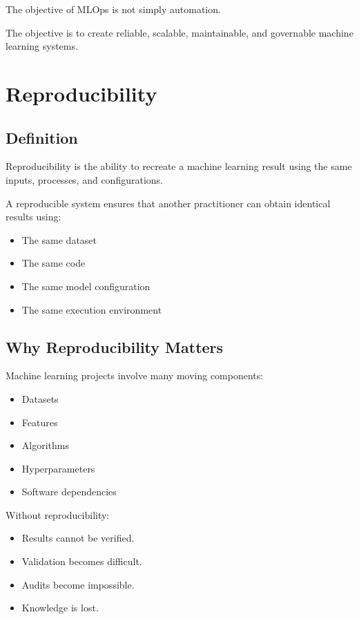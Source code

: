 The objective of MLOps is not simply automation.

The objective is to create reliable, scalable, maintainable, and governable machine learning systems.

\section{Reproducibility}

\subsection{Definition}

Reproducibility is the ability to recreate a machine learning result using the same inputs, processes, and configurations.

A reproducible system ensures that another practitioner can obtain identical results using:

\begin{itemize}
    \item The same dataset
    \item The same code
    \item The same model configuration
    \item The same execution environment
\end{itemize}

\subsection{Why Reproducibility Matters}

Machine learning projects involve many moving components:

\begin{itemize}
    \item Datasets
    \item Features
    \item Algorithms
    \item Hyperparameters
    \item Software dependencies
\end{itemize}

Without reproducibility:

\begin{itemize}
    \item Results cannot be verified.
    \item Validation becomes difficult.
    \item Audits become impossible.
    \item Knowledge is lost.
\end{itemize}

